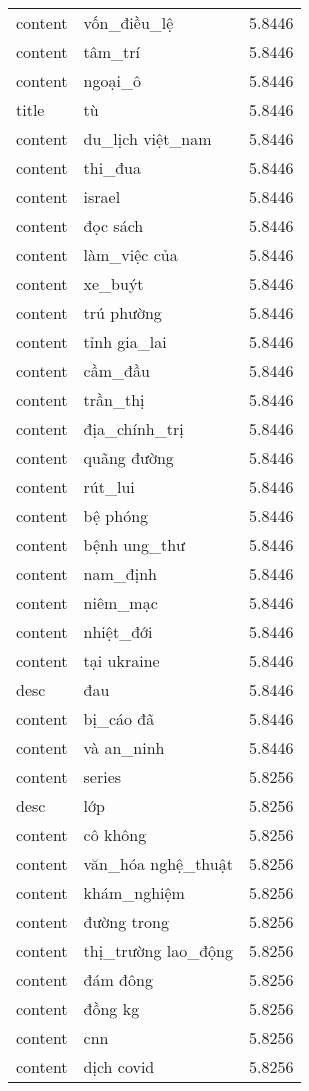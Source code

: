 \documentclass{article}
\begin{document}
\begin{tabular}{lll}
content & vốn\_điều\_lệ & 5.8446\\
content & tâm\_trí & 5.8446\\
content & ngoại\_ô & 5.8446\\
title & tù & 5.8446\\
content & du\_lịch việt\_nam & 5.8446\\
content & thi\_đua & 5.8446\\
content & israel & 5.8446\\
content & đọc sách & 5.8446\\
content & làm\_việc của & 5.8446\\
content & xe\_buýt & 5.8446\\
content & trú phường & 5.8446\\
content & tỉnh gia\_lai & 5.8446\\
content & cầm\_đầu & 5.8446\\
content & trần\_thị & 5.8446\\
content & địa\_chính\_trị & 5.8446\\
content & quãng đường & 5.8446\\
content & rút\_lui & 5.8446\\
content & bệ phóng & 5.8446\\
content & bệnh ung\_thư & 5.8446\\
content & nam\_định & 5.8446\\
content & niêm\_mạc & 5.8446\\
content & nhiệt\_đới & 5.8446\\
content & tại ukraine & 5.8446\\
desc & đau & 5.8446\\
content & bị\_cáo đã & 5.8446\\
content & và an\_ninh & 5.8446\\
content & series & 5.8256\\
desc & lớp & 5.8256\\
content & cô không & 5.8256\\
content & văn\_hóa nghệ\_thuật & 5.8256\\
content & khám\_nghiệm & 5.8256\\
content & đường trong & 5.8256\\
content & thị\_trường lao\_động & 5.8256\\
content & đám đông & 5.8256\\
content & đồng kg & 5.8256\\
content & cnn & 5.8256\\
content & dịch covid & 5.8256\\

\end{tabular}
\end{document}
